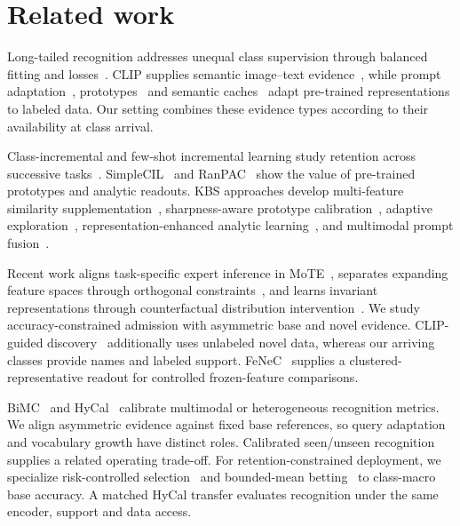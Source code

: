 \documentclass[preprint,review,12pt]{elsarticle}
\begin{document}
\section{Related work}
Long-tailed recognition addresses unequal class supervision through balanced fitting and losses~\cite{liu2019large,cao2019ldam,cui2019classbalanced}. CLIP supplies semantic image--text evidence~\cite{radford2021clip}, while prompt adaptation~\cite{zhou2022coop,shi2024lift}, prototypes~\cite{snell2017prototypical,wang2019simpleshot} and semantic caches~\cite{zhang2022tipadapter} adapt pre-trained representations to labeled data. Our setting combines these evidence types according to their availability at class arrival.

Class-incremental and few-shot incremental learning study retention across successive tasks~\cite{rebuffi2017icarl,tao2020fewshot}. SimpleCIL~\cite{zhou2024simplecil} and RanPAC~\cite{mcdonnell2023ranpac} show the value of pre-trained prototypes and analytic readouts. KBS approaches develop multi-feature similarity supplementation~\cite{xu2023mfs3}, sharpness-aware prototype calibration~\cite{chen2024sagg}, adaptive exploration~\cite{han2025adaptive}, representation-enhanced analytic learning~\cite{he2026real}, and multimodal prompt fusion~\cite{fang2026bpcclip}.

Recent work aligns task-specific expert inference in MoTE~\cite{li2025mote}, separates expanding feature spaces through orthogonal constraints~\cite{dong2026deon}, and learns invariant representations through counterfactual distribution intervention~\cite{yuan2026cdi}. We study accuracy-constrained admission with asymmetric base and novel evidence. CLIP-guided discovery~\cite{yan2025clipdiscovery} additionally uses unlabeled novel data, whereas our arriving classes provide names and labeled support. FeNeC~\cite{ksiazek2026fenec} supplies a clustered-representative readout for controlled frozen-feature comparisons.

BiMC~\cite{chen2025bimc} and HyCal~\cite{lee2026hycal} calibrate multimodal or heterogeneous recognition metrics. We align asymmetric evidence against fixed base references, so query adaptation and vocabulary growth have distinct roles. Calibrated seen/unseen recognition~\cite{chao2016calibrated} supplies a related operating trade-off. For retention-constrained deployment, we specialize risk-controlled selection~\cite{angelopoulos2021ltt} and bounded-mean betting~\cite{waudby2024betting} to class-macro base accuracy. A matched HyCal transfer evaluates recognition under the same encoder, support and data access.
\end{document}
